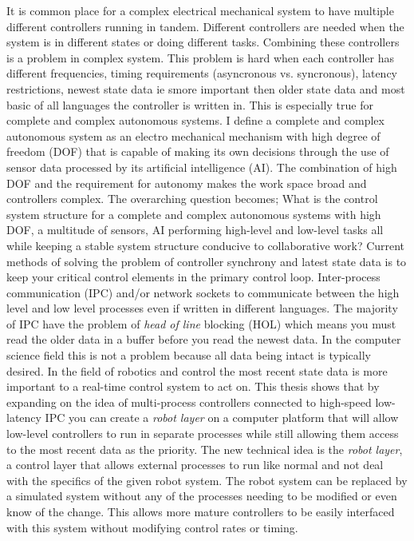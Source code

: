 
It is common place for a complex electrical mechanical system to have multiple different controllers running in tandem.  
Different controllers are needed when the system is in different states or doing different tasks.
Combining these controllers is a problem in complex system.
This problem is hard when each controller has different frequencies, timing requirements (asyncronous vs. syncronous), latency restrictions, newest state data ie smore important then older state data and most basic of all languages the controller is written in.
This is especially true for complete and complex autonomous systems.
I define a complete and complex autonomous system as an electro mechanical mechanism with high degree of freedom (DOF) that is capable of making its own decisions through the use of sensor data processed by its artificial intelligence (AI).
The combination of high DOF and the requirement for autonomy makes the work space broad and controllers complex.
The overarching question becomes; What is the control system structure for a complete and complex autonomous systems with high DOF, a multitude of sensors, AI performing high-level and low-level tasks all while keeping a stable system structure conducive to collaborative work?
Current methods of solving the problem of controller synchrony and latest state data is to keep your critical control elements in the primary control loop.
Inter-process communication (IPC) and/or network sockets to communicate between the high level and low level processes even if written in different languages.
The majority of IPC have the problem of \textit{head of line} blocking (HOL) which means you must read the older data in a buffer before you read the newest data.
In the computer science field this is not a problem because all data being intact is typically desired.  
In the field of robotics and control the most recent state data is more important to a real-time control system to act on.
This thesis shows that by expanding on the idea of multi-process controllers connected to high-speed low-latency IPC you can create a \textit{robot layer} on a computer platform that will allow low-level controllers to run in separate processes while still allowing them access to the most recent data as the priority.
The new technical idea is the \textit{robot layer}, a control layer that allows external processes to run like normal and not deal with the specifics of the given robot system.
The robot system can be replaced by a simulated system without any of the processes needing to be modified or even know of the change.
This allows more mature controllers to be easily interfaced with this system without modifying control rates or timing.

